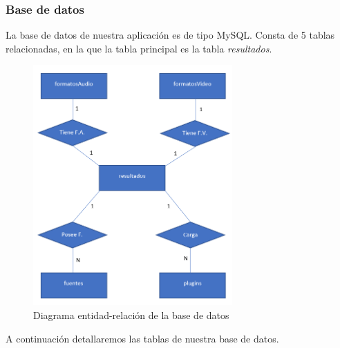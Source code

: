 \subsubsection{Base de datos}
La base de datos de nuestra aplicación es de tipo MySQL. Consta de 5 tablas relacionadas, en la que la tabla principal es la tabla \textit{resultados}.
\begin{figure}[H]
    \centering
    \includegraphics[width=0.68\textwidth]{Images/entidad relacion.png}
    \caption{Diagrama entidad-relación de la base de datos}
    \label{fig:diagramaEntidadRelacion}
\end{figure}
A continuación detallaremos las tablas de nuestra base de datos.
